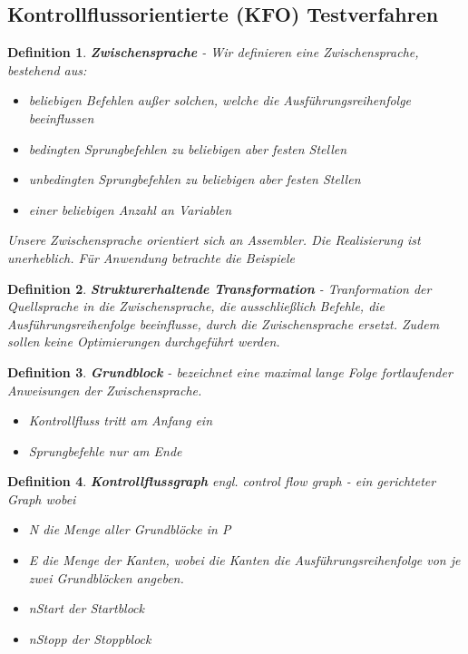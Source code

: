 \documentclass[a4paper]{article}
\theoremstyle{break}
\newtheorem{defi}{Definition}[section]
\begin{document}
        \subsection{Kontrollflussorientierte (KFO) Testverfahren}
        \begin{defi}
          \textbf{Zwischensprache} - Wir definieren eine Zwischensprache, bestehend aus:
          \begin{itemize}
          \item beliebigen Befehlen außer solchen, welche die Ausführungsreihenfolge beeinflussen
          \item bedingten Sprungbefehlen zu beliebigen aber festen Stellen
          \item unbedingten Sprungbefehlen zu beliebigen aber festen Stellen
          \item einer beliebigen Anzahl an Variablen
          \end{itemize}
          Unsere Zwischensprache orientiert sich an Assembler.
          Die Realisierung ist unerheblich.
          Für Anwendung betrachte die Beispiele
        \end{defi}

        \begin{defi}
          \textbf{Strukturerhaltende Transformation} - Tranformation der Quellsprache in die Zwischensprache, die ausschließlich Befehle, die Ausführungsreihenfolge beeinflusse, durch die Zwischensprache ersetzt.
          Zudem sollen keine Optimierungen durchgeführt werden.
        \end{defi}

        \begin{defi}
          \textbf{Grundblock} - bezeichnet eine maximal lange Folge fortlaufender Anweisungen der Zwischensprache.
          \begin{itemize}
          \item Kontrollfluss tritt am Anfang ein
          \item Sprungbefehle nur am Ende
          \end{itemize}
        \end{defi}

        \begin{defi}
          \textbf{Kontrollflussgraph} \textit{engl. control flow graph} - ein gerichteter Graph wobei
          \begin{itemize}
          \item N die Menge aller Grundblöcke in P
          \item E die Menge der Kanten, wobei die Kanten die Ausführungsreihenfolge von je zwei Grundblöcken angeben.
          \item nStart der Startblock
          \item nStopp der Stoppblock
          \end{itemize}
        \end{defi}
\end{document}
